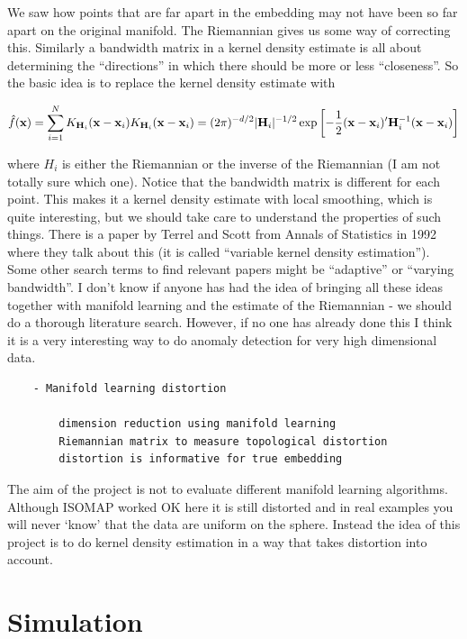 \documentclass[11pt,a4paper,]{article}
\begin{document}
We saw how points that are far apart in the embedding may not have been so far apart on the original manifold. The Riemannian gives us some way of correcting this. Similarly a bandwidth matrix in a kernel density estimate is all about determining the ``directions'' in which there should be more or less ``closeness''. So the basic idea is to replace the kernel density estimate with

\[
\hat{f}(\mathbf{x})=\sum\limits_{i=1}^N K_{\mathbf{H}_i}(\mathbf{x}-\mathbf{x}_i)\\
K_{\mathbf{H}_i}(\mathbf{x}-\mathbf{x}_i)=(2\pi)^{-d/2}|\mathbf{H}_i|^{-1/2}\exp\left[-\frac{1}{2}(\mathbf{x}-\mathbf{x}_i)'\mathbf{H}_i^{-1}(\mathbf{x}-\mathbf{x}_i)\right]
\]

where \(H_i\) is either the Riemannian or the inverse of the Riemannian (I am not totally sure which one). Notice that the bandwidth matrix is different for each point. This makes it a kernel density estimate with local smoothing, which is quite interesting, but we should take care to understand the properties of such things. There is a paper by Terrel and Scott from Annals of Statistics in 1992 where they talk about this (it is called ``variable kernel density estimation''). Some other search terms to find relevant papers might be ``adaptive'' or ``varying bandwidth''. I don't know if anyone has had the idea of bringing all these ideas together with manifold learning and the estimate of the Riemannian - we should do a thorough literature search. However, if no one has already done this I think it is a very interesting way to do anomaly detection for very high dimensional data.

\begin{verbatim}
    - Manifold learning distortion

        dimension reduction using manifold learning
        Riemannian matrix to measure topological distortion
        distortion is informative for true embedding
\end{verbatim}

The aim of the project is not to evaluate different manifold learning algorithms. Although ISOMAP worked OK here it is still distorted and in real examples you will never `know' that the data are uniform on the sphere. Instead the idea of this project is to do kernel density estimation in a way that takes distortion into account.

\hypertarget{simulation}{%
\section{Simulation}\label{simulation}}
\end{document}

